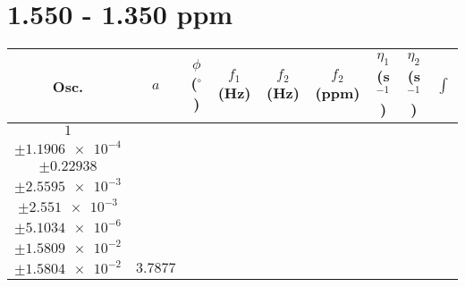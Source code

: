 \documentclass[8pt]{article}
\begin{document}
\section*{1.550 - 1.350 ppm}
\begin{longtable}[l]{c c c c c c c c c}
\toprule
Osc. & $a$ & $\phi$ ($^{\circ}$) & $f_1$ (Hz) & $f_2$ (Hz) & $f_2$ (ppm) & $\eta_1$ (s$^{-1}$) & $\eta_2$ (s$^{-1}$) & $\int$\\
\midrule
$\num{1}$ & \begin{tabular}[c]{@{}c@{}}$\num{2.8851e-2}$ \\ $\pm\num{1.1906e-4}$\end{tabular} & \begin{tabular}[c]{@{}c@{}}$\num{-0.11081}$ \\ $\pm\num{0.22938}$\end{tabular} & \begin{tabular}[c]{@{}c@{}}$\num{-9.3849}$ \\ $\pm\num{2.5595e-3}$\end{tabular} & \begin{tabular}[c]{@{}c@{}}$\num{721.2}$ \\ $\pm\num{2.551e-3}$\end{tabular} & \begin{tabular}[c]{@{}c@{}}$\num{1.4428}$ \\ $\pm\num{5.1034e-6}$\end{tabular} & \begin{tabular}[c]{@{}c@{}}$\num{3.9769}$ \\ $\pm\num{1.5809e-2}$\end{tabular} & \begin{tabular}[c]{@{}c@{}}$\num{3.9606}$ \\ $\pm\num{1.5804e-2}$\end{tabular} & $\num{3.7877}$\\

\end{longtable}
\end{document}
